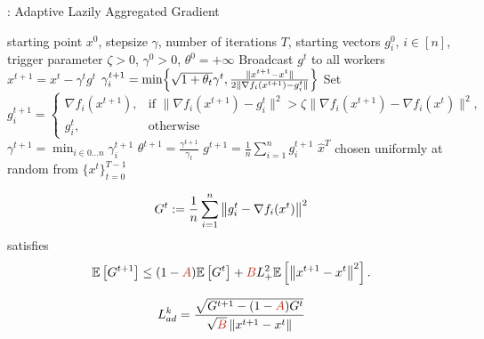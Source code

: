 \documentclass[nohyperref]{article}
\theoremstyle{plain}
\theoremstyle{definition}
\theoremstyle{remark}
\newcommand{\n}[1]{\|#1 \|}
\begin{document}
 

\begin{algorithm}[h]
	\caption*{: Adaptive Lazily Aggregated Gradient}\label{alg:lag}
	\begin{algorithmic}[1]
		 starting point $x^0$, stepsize $\gamma$, number of iterations $T$, starting vectors $g_i^0$, $i \in [n]$, trigger parameter $\zeta > 0$, $\gamma^0>0$,
     $\theta^0=+\infty$
		\STATE Broadcast $g^t$ to all workers
		\STATE $x^{t+1} = x^t - \gamma^t g^t$
		\STATE $\gamma^{t+1}_i = \min\Bigl\{
        \sqrt{1+\theta_{t}}\gamma^{t},\frac{\n{x^{t+1}-x^{t}}}{2\n{
        \nabla f_i(x^{t+1}) - g_i^t}}\Bigr\}$
		\STATE Set $g_i^{t+1} = \begin{cases} \nabla f_i(x^{t+1}) ,& \text{if } \|\nabla f_i(x^{t+1}) - g_i^t\|^2 > \zeta \|\nabla f_i(x^{t+1}) - \nabla f_i(x^t)\|^2,\\ g_i^t,& \text{otherwise} \end{cases}$ 
		\ENDFOR
		\STATE $\gamma^{t+1} = \min_{i \in 0\ldots n} \gamma^{t+1}_i$
		\STATE $\theta^{t+1} = \frac{\gamma^{t+1}}{\gamma_{t}}$
		\STATE $g^{t+1} = \tfrac{1}{n}\sum_{i=1}^ng_i^{t+1}$
		\ENDFOR
		 $\hat x^T$ chosen uniformly at random from $\{x^t\}_{t=0}^{T-1}$
	\end{algorithmic}
\end{algorithm}

\begin{equation}\label{eq:G^t_appendix} 
 G^t := \frac{1}{n} \sum \limits_{i=1}^n \left\|  g_i^t-\nabla f_i(x^{t})  \right\|^{2}
\end{equation}
satisfies
\begin{eqnarray}
	\Exp{G^{t+1}} \leq (1-\thetaNEW)\Exp{G^t} + \betaNEW L_{+}^2 \Exp{\sqnorm{x^{t+1} - x^t}}. \label{eq:key_inequality_appendix}
\end{eqnarray}

\begin{equation}
    L^k_{ad} = \frac{\sqrt{G^{t+1} - (1-\thetaNEW)G^t}}{\sqrt{\betaNEW} \norm{x^{t+1} - x^t}}
\end{equation}
\end{document}
